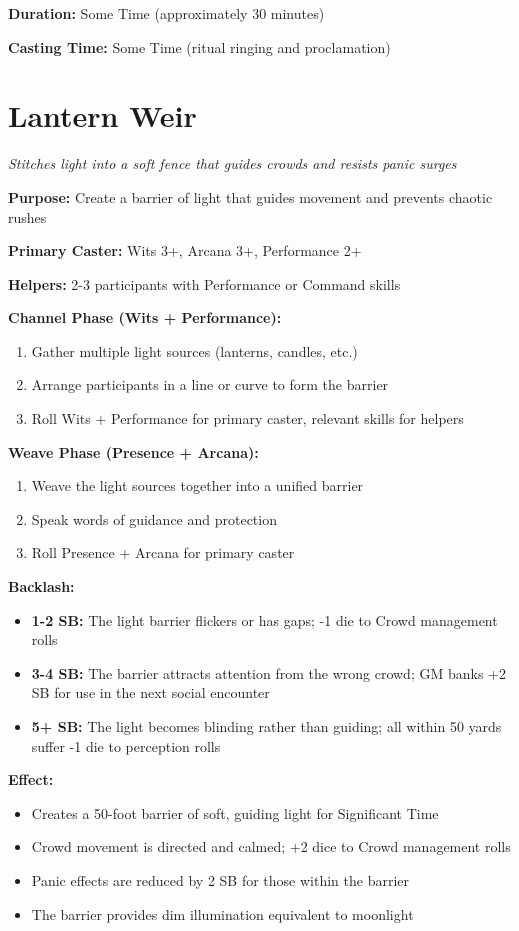 \textbf{Duration:} Some Time (approximately 30 minutes)

\textbf{Casting Time:} Some Time (ritual ringing and proclamation)

\section*{Lantern Weir}
\textit{Stitches light into a soft fence that guides crowds and resists panic surges}

\textbf{Purpose:} Create a barrier of light that guides movement and prevents chaotic rushes

\textbf{Primary Caster:} Wits 3+, Arcana 3+, Performance 2+

\textbf{Helpers:} 2-3 participants with Performance or Command skills

\textbf{Channel Phase (Wits + Performance):}
\begin{enumerate}
\item Gather multiple light sources (lanterns, candles, etc.)
\item Arrange participants in a line or curve to form the barrier
\item Roll Wits + Performance for primary caster, relevant skills for helpers
\end{enumerate}

\textbf{Weave Phase (Presence + Arcana):}
\begin{enumerate}
\item Weave the light sources together into a unified barrier
\item Speak words of guidance and protection
\item Roll Presence + Arcana for primary caster
\end{enumerate}

\textbf{Backlash:}
\begin{itemize}
\item \textbf{1-2 SB:} The light barrier flickers or has gaps; -1 die to Crowd management rolls
\item \textbf{3-4 SB:} The barrier attracts attention from the wrong crowd; GM banks +2 SB for use in the next social encounter
\item \textbf{5+ SB:} The light becomes blinding rather than guiding; all within 50 yards suffer -1 die to perception rolls
\end{itemize}

\textbf{Effect:}
\begin{itemize}
\item Creates a 50-foot barrier of soft, guiding light for Significant Time
\item Crowd movement is directed and calmed; +2 dice to Crowd management rolls
\item Panic effects are reduced by 2 SB for those within the barrier
\item The barrier provides dim illumination equivalent to moonlight
\end{itemize}

